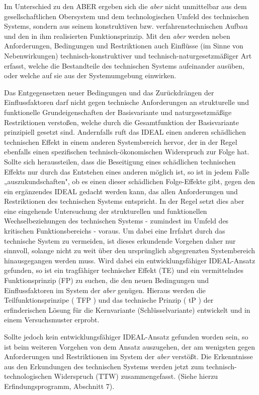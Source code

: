\documentclass[12pt,a4paper]{article}
\begin{document}
Im Unterschied zu den ABER ergeben sich die \emph{aber} nicht unmittelbar aus dem gesellschaftlichen Obersystem und dem technologischen Umfeld des technischen Systems, sondern aus seinem konstruktiven bzw. verfahrenstechnischen Aufbau und den in ihm realisierten Funktionsprinzip. Mit den \emph{aber}  werden neben Anforderungen, Bedingungen und Restriktionen auch Einflüsse (im Sinne von Nebenwirkungen) technisch-konstruktiver und tech­nisch-naturgesetzmäßiger Art erfasst, welche die Bestandteile des technischen Systems aufeinander ausüben, oder welche auf sie aus der Systemumgebung einwirken.

Das Entgegensetzen neuer Bedingungen und das Zurückdrängen der Einflussfaktoren darf nicht gegen technische Anforderungen an strukturelle und funktionelle Grundeigenschaften der Basisvarian­te und naturgesetzmäßige Restriktionen verstoßen, welche durch die Gesamtfunktion der Basisvariante prinzipiell gesetzt sind. Andernfalls ruft das IDEAL einen anderen schädlichen technischen Effekt in einem anderen Systembereich hervor, der in der Regel ebenfalls einen spezifischen technisch-ökonomischen Widerspruch zur Folge hat. Sollte sich heraussteilen, dass die Beseitigung eines schädlichen technischen Effekts nur durch das Entstehen eines anderen möglich ist, so ist in jedem Falle „auszukundschaften", ob es einen dieser schädlichen Folge-Effekte gibt, gegen den ein ergänzendes IDEAL gedacht werden kann, das allen Anforde­rungen und Restriktionen des technischen Systems entspricht. In der Regel setzt dies aber eine eingehende Untersuchung der strukturellen und funktionellen Wechselbeziehungen des technischen Systems - zumindest im Umfeld des kritischen Funktionsbereichs - voraus. Um dabei eine Irrfahrt durch das technische System zu vermeiden, ist dieses erkundende Vorgehen daher nur sinnvoll, solange nicht zu weit über den ursprünglich abgegrenzten Systembereich hinausgegangen werden muss. Wird dabei ein entwicklungsfähiger IDEAL-Ansatz gefunden, so ist ein tragfähiger technischer Effekt (TE) und ein vermittelndes Funktionsprinzip (FP) zu suchen, die den neuen Bedingungen und Einflussfaktoren im System der \emph{aber} genügen. Hieraus werden die Teilfunktionsprinzipe ( TFP ) und das tech­nische Prinzip ( tP ) der erfinderischen Lösung für die Kernvariante (Schlüsselvariante) entwickelt und in einem Versuchsmuster erprobt.

Sollte jedoch kein entwicklungsfähiger IDEAL-Ansatz gefunden worden sein, so ist beim weiteren Vorgehen von dem Ansatz auszugehen, der am wenigsten gegen Anforderungen und Restriktionen im System der \emph{aber} verstößt. Die Erkenntnisse aus den Erkundungen des technischen Systems werden jetzt zum technisch-technologischen Widerspruch (TTW) zusammengefasst. (Siehe hierzu Erfindungspro­gramm, Abschnitt 7).
\end{document}
